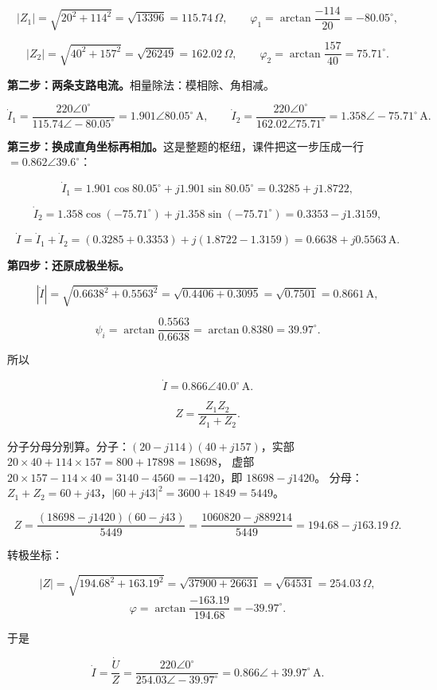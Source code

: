 \documentclass[11pt]{ctexart}
\begin{document}
\[ |Z_1|=\sqrt{20^{2}+114^{2}}=\sqrt{13396}=115.74\,\Omega ,\qquad
   \varphi_1=\arctan\frac{-114}{20}=-80.05^\circ , \]

\[ |Z_2|=\sqrt{40^{2}+157^{2}}=\sqrt{26249}=162.02\,\Omega ,\qquad
   \varphi_2=\arctan\frac{157}{40}=75.71^\circ . \]

\textbf{第二步：两条支路电流。}相量除法：模相除、角相减。

\[ \dot I_1=\frac{220\angle0^\circ}{115.74\angle-80.05^\circ}=1.901\angle80.05^\circ\,\mathrm{A} ,\qquad
   \dot I_2=\frac{220\angle0^\circ}{162.02\angle75.71^\circ}=1.358\angle-75.71^\circ\,\mathrm{A} . \]

\textbf{第三步：换成直角坐标再相加。}这是整题的枢纽，课件把这一步压成一行 $=0.862\angle39.6^\circ$：

\[ \dot I_1=1.901\cos80.05^\circ+j1.901\sin80.05^\circ=0.3285+j1.8722 , \]

\[ \dot I_2=1.358\cos(-75.71^\circ)+j1.358\sin(-75.71^\circ)=0.3353-j1.3159 , \]

\[ \dot I=\dot I_1+\dot I_2=(0.3285+0.3353)+j(1.8722-1.3159)=0.6638+j0.5563\,\mathrm{A} . \]

\textbf{第四步：还原成极坐标。}

\[ |\dot I|=\sqrt{0.6638^{2}+0.5563^{2}}=\sqrt{0.4406+0.3095}=\sqrt{0.7501}=0.8661\,\mathrm{A} , \]

\[ \psi_i=\arctan\frac{0.5563}{0.6638}=\arctan0.8380=39.97^\circ . \]

所以

\[ \dot I=0.866\angle40.0^\circ\,\mathrm{A} . \]


\[ Z=\frac{Z_1Z_2}{Z_1+Z_2} . \]

分子分母分别算。分子：$(20-j114)(40+j157)$，实部 $20\times40+114\times157=800+17898=18698$，
虚部 $20\times157-114\times40=3140-4560=-1420$，即 $18698-j1420$。
分母：$Z_1+Z_2=60+j43$，$|60+j43|^2=3600+1849=5449$。

\[ Z=\frac{(18698-j1420)(60-j43)}{5449}
   =\frac{1060820-j889214}{5449}
   =194.68-j163.19\,\Omega . \]

转极坐标：

\[ |Z|=\sqrt{194.68^{2}+163.19^{2}}=\sqrt{37900+26631}=\sqrt{64531}=254.03\,\Omega , \]
\[ \varphi=\arctan\frac{-163.19}{194.68}=-39.97^\circ . \]

于是

\[ \dot I=\frac{\dot U}{Z}=\frac{220\angle0^\circ}{254.03\angle-39.97^\circ}
   =0.866\angle+39.97^\circ\,\mathrm{A} . \]
\end{document}
